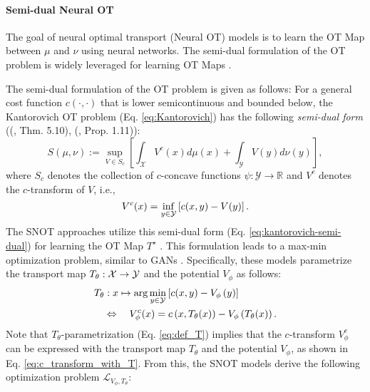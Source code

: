 \paragraph{Semi-dual Neural OT}
The goal of neural optimal transport (Neural OT) models is to learn the OT Map between $\mu$ and $\nu$ using neural networks. 
The semi-dual formulation of the OT problem is widely leveraged for learning OT Maps \cite{otm, fanscalable, uotm, otmICNN}. 

The semi-dual formulation of the OT problem is given as follows: For a general cost function $c(\cdot, \cdot)$ that is lower semicontinuous and bounded below, the Kantorovich OT problem (Eq. \ref{eq:Kantorovich}) has the following \textit{semi-dual form} ((\citet{villani}, Thm. 5.10), (\citet{santambrogio}, Prop. 1.11)):
\begin{equation} \label{eq:kantorovich-semi-dual}
     S(\mu,\nu):= \!\!\sup_{V\in S_c} \left[ \int_\mathcal{X} V^c(x)d\mu(x) \!+\!\! \int_\mathcal{Y} V(y) d\nu (y) \right],
\end{equation}
where $S_c$ denotes the collection of $c$-concave functions $\psi: \mathcal{Y}\rightarrow \mathbb{R}$ and $V^{c}$ denotes the $c$-transform of $V$, i.e., 
\vspace{-5pt}
\begin{equation} \label{eq:def_c_transform}
  V^c(x)=\underset{y\in \mathcal{Y}}{\inf}\left[ c(x,y) - V(y) \right].
  \vspace{-5pt}
\end{equation}
The SNOT approaches utilize this semi-dual form (Eq. \ref{eq:kantorovich-semi-dual}) for learning the OT Map $T^{\star}$ \citep{otm, fanscalable, otmICNN}. This formulation leads to a max-min optimization problem, similar to GANs \cite{gan}. Specifically, these models parametrize the transport map $T_{\theta} : {\mathcal{X}} \rightarrow {\mathcal{Y}}$ and the potential $V_{\phi}$ as follows:
\vspace{-5pt}
\begin{align} 
    & T_{\theta}: x \mapsto \arg\min_{y \in \mathcal{Y}} \left[c(x, y) - V_{\phi}\left( y \right)\right] \label{eq:def_T} \\
    & \quad \Leftrightarrow \quad V_{\phi}^c(x)=c\left(x,T_{\theta}(x) \right) - V_{\phi}\left(T_{\theta}(x)\right). \label{eq:c_transform_with_T}
    \vspace{-5pt}
\end{align}
Note that $T_{\theta}$-parametrization (Eq. \ref{eq:def_T}) implies that the $c$-transform $V_{\phi}^{c}$ can be expressed with the transport map $T_{\theta}$ and the potential $V_{\phi}$, as shown in Eq. \ref{eq:c_transform_with_T}. From this, the SNOT models derive the following optimization problem $\mathcal{L}_{V_{\phi}, T_{\theta}}$:
